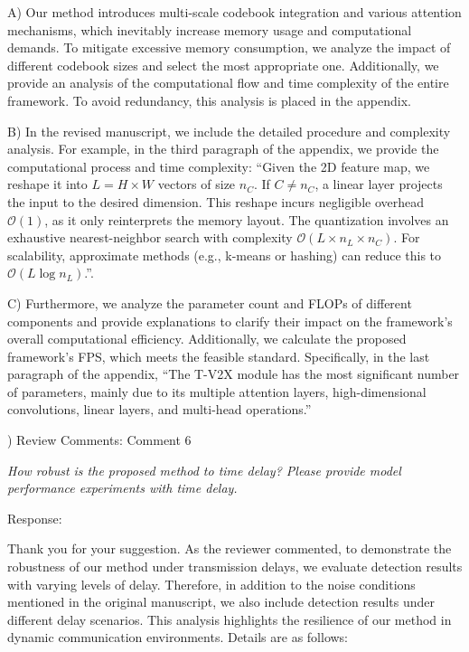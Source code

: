 \documentclass[12pt,a4paper]{article}
\begin{document}
A) Our method introduces multi-scale codebook integration and various attention mechanisms, which inevitably increase memory usage and computational demands. To mitigate excessive memory consumption, we analyze the impact of different codebook sizes and select the most appropriate one. Additionally, we provide an analysis of the computational flow and time complexity of the entire framework. To avoid redundancy, this analysis is placed in the appendix.


B) In the revised manuscript, we include the detailed procedure and complexity analysis. For example, in the third paragraph of the appendix, we provide the computational process and time complexity: ``Given the 2D feature map, we reshape it into $L = H \times W$ vectors of size $n_C$. If $C \ne n_C$, a linear layer projects the input to the desired dimension. This reshape incurs negligible overhead $\mathcal{O}(1)$, as it only reinterprets the memory layout.
The quantization involves an exhaustive nearest-neighbor search with complexity $\mathcal{O}(L \times n_L \times n_C)$. For scalability, approximate methods (e.g., k-means or hashing) can reduce this to $\mathcal{O}(L \log n_L)$.''.

C) Furthermore, we analyze the parameter count and FLOPs of different components and provide explanations to clarify their impact on the framework's overall computational efficiency. Additionally, we calculate the proposed framework's FPS, which meets the feasible standard. Specifically, in the last paragraph of the appendix, ``The T-V2X module has the most significant number of parameters, mainly due to its multiple attention layers, high-dimensional convolutions, linear layers, and multi-head operations.''  



\vspace{4ex}
) Review Comments: Comment 6

\textit{How robust is the proposed method to time delay? Please provide model performance experiments with time delay.}

\noindent Response:

Thank you for your suggestion. As the reviewer commented, to demonstrate the robustness of our method under transmission delays, we evaluate detection results with varying levels of delay. Therefore, in addition to the noise conditions mentioned in the original manuscript, we also include detection results under different delay scenarios. This analysis highlights the resilience of our method in dynamic communication environments.
Details are as follows:
\end{document}
